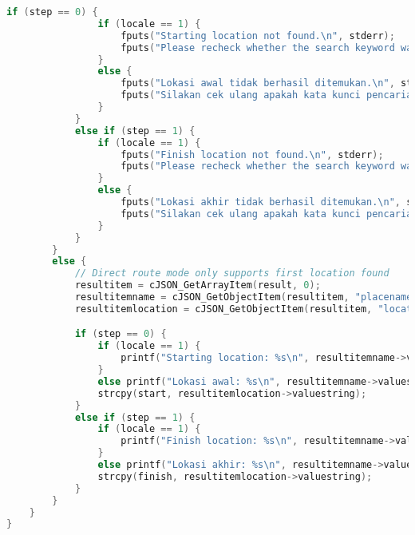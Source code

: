 \begin{lstlisting}[label={appdx:A-write-findroute}, language=C, caption=\texttt{write\textunderscore findroute()}]
            if (step == 0) {
                if (locale == 1) {
                    fputs("Starting location not found.\n", stderr);
                    fputs("Please recheck whether the search keyword was inputted correctly.\n", stderr);
                }
                else {
                    fputs("Lokasi awal tidak berhasil ditemukan.\n", stderr);
                    fputs("Silakan cek ulang apakah kata kunci pencarian sudah dimasukkan dengan benar.\n", stderr);
                }
            }
            else if (step == 1) {
                if (locale == 1) {
                    fputs("Finish location not found.\n", stderr);
                    fputs("Please recheck whether the search keyword was inputted correctly.\n", stderr);
                }
                else {
                    fputs("Lokasi akhir tidak berhasil ditemukan.\n", stderr);
                    fputs("Silakan cek ulang apakah kata kunci pencarian sudah dimasukkan dengan benar.\n", stderr);
                }
            }
        }
        else {
            // Direct route mode only supports first location found
            resultitem = cJSON_GetArrayItem(result, 0);
            resultitemname = cJSON_GetObjectItem(resultitem, "placename");
            resultitemlocation = cJSON_GetObjectItem(resultitem, "location");

            if (step == 0) {
                if (locale == 1) {
                    printf("Starting location: %s\n", resultitemname->valuestring);
                }
                else printf("Lokasi awal: %s\n", resultitemname->valuestring);
                strcpy(start, resultitemlocation->valuestring);
            }
            else if (step == 1) {
                if (locale == 1) {
                    printf("Finish location: %s\n", resultitemname->valuestring);
                }
                else printf("Lokasi akhir: %s\n", resultitemname->valuestring);
                strcpy(finish, resultitemlocation->valuestring);
            }
        }
    }
}
\end{lstlisting}

